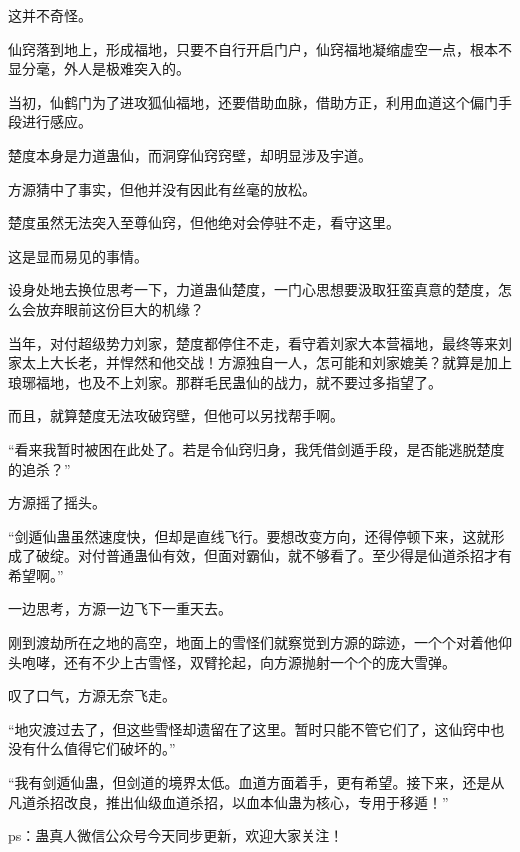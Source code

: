 \begin{this_body}
这并不奇怪。

仙窍落到地上，形成福地，只要不自行开启门户，仙窍福地凝缩虚空一点，根本不显分毫，外人是极难突入的。

当初，仙鹤门为了进攻狐仙福地，还要借助血脉，借助方正，利用血道这个偏门手段进行感应。

楚度本身是力道蛊仙，而洞穿仙窍窍壁，却明显涉及宇道。

方源猜中了事实，但他并没有因此有丝毫的放松。

楚度虽然无法突入至尊仙窍，但他绝对会停驻不走，看守这里。

这是显而易见的事情。

设身处地去换位思考一下，力道蛊仙楚度，一门心思想要汲取狂蛮真意的楚度，怎么会放弃眼前这份巨大的机缘？

当年，对付超级势力刘家，楚度都停住不走，看守着刘家大本营福地，最终等来刘家太上大长老，并悍然和他交战！方源独自一人，怎可能和刘家媲美？就算是加上琅琊福地，也及不上刘家。那群毛民蛊仙的战力，就不要过多指望了。

而且，就算楚度无法攻破窍壁，但他可以另找帮手啊。

“看来我暂时被困在此处了。若是令仙窍归身，我凭借剑遁手段，是否能逃脱楚度的追杀？”

方源摇了摇头。

“剑遁仙蛊虽然速度快，但却是直线飞行。要想改变方向，还得停顿下来，这就形成了破绽。对付普通蛊仙有效，但面对霸仙，就不够看了。至少得是仙道杀招才有希望啊。”

一边思考，方源一边飞下一重天去。

刚到渡劫所在之地的高空，地面上的雪怪们就察觉到方源的踪迹，一个个对着他仰头咆哮，还有不少上古雪怪，双臂抡起，向方源抛射一个个的庞大雪弹。

叹了口气，方源无奈飞走。

“地灾渡过去了，但这些雪怪却遗留在了这里。暂时只能不管它们了，这仙窍中也没有什么值得它们破坏的。”

“我有剑遁仙蛊，但剑道的境界太低。血道方面着手，更有希望。接下来，还是从凡道杀招改良，推出仙级血道杀招，以血本仙蛊为核心，专用于移遁！”

ps：蛊真人微信公众号今天同步更新，欢迎大家关注！

\end{this_body}

